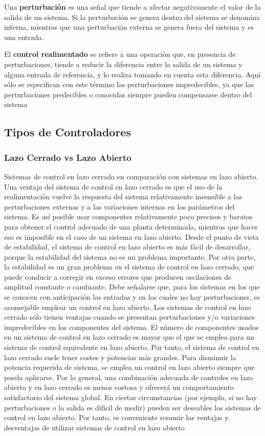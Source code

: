 Una \textbf{perturbación}  es una señal que tiende a afectar negativamente el valor de la salida de un sistema. Si la perturbación se genera dentro del sistema se denomina interna, mientras que una perturbación externa se genera fuera del sistema y es una entrada.

El \textbf{control realimentado} se refiere a una operación que, en presencia de perturbaciones, tiende a reducir la diferencia entre la salida de un sistema y alguna entrada de referencia, y lo realiza tomando en cuenta esta diferencia. Aquí sólo se especifican con este término las perturbaciones impredecibles, ya que las perturbaciones predecibles o conocidas siempre pueden compensarse dentro del sistema

\subsection*{Tipos de Controladores}
\subsubsection*{Lazo Cerrado vs Lazo Abierto}

Sistemas de control en lazo cerrado en comparación con sistemas en lazo abierto. Una ventaja del sistema de control en lazo cerrado es que el uso de la realimentación vuelve la respuesta del sistema relativamente insensible a las perturbaciones externas y a las variaciones internas en los parámetros del sistema. Es así posible usar componentes relativamente poco precisos y baratos para obtener el control adecuado de una planta determinada, mientras que hacer eso es imposible en el caso de un sistema en lazo abierto. Desde el punto de vista de estabilidad, el sistema de control en lazo abierto es más fácil de desarrollar, porque la estabilidad del sistema no es un problema importante. Por otra parte, la estabilidad es un gran problema en el sistema de control en lazo cerrado, que puede conducir a corregir en exceso errores que producen oscilaciones de amplitud constante o cambiante. Debe señalarse que, para los sistemas en los que se conocen con anticipación las entradas y en los cuales no hay perturbaciones, es aconsejable emplear un control en lazo abierto. Los sistemas de control en lazo cerrado sólo tienen ventajas cuando se presentan perturbaciones y/o variaciones impredecibles en los componentes del sistema. El número de componentes usados en un sistema de control en lazo cerrado es mayor que el que se emplea para un sistema de control equivalente en lazo abierto. Por tanto, el sistema de control en lazo cerrado suele tener costes y potencias más grandes. Para disminuir la potencia requerida de sistema, se emplea un control en lazo abierto siempre que pueda aplicarse. Por lo general, una combinación adecuada de controles en lazo abierto y en lazo cerrado es menos costosa y ofrecerá un comportamiento satisfactorio del sistema global.
En ciertas circunstancias (por ejemplo, si no hay perturbaciones o la salida es difícil de medir) pueden ser deseables los sistemas de control en lazo abierto. Por tanto, es conveniente resumir las ventajas y desventajas de utilizar sistemas de control en lazo abierto\cite{Ogata2013}

